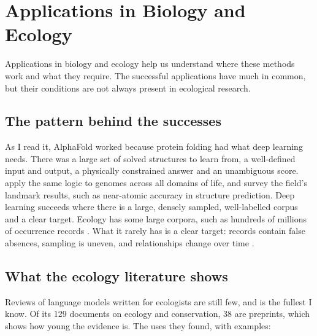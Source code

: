\chapter{Applications in Biology and Ecology}
\label{ch:applications}

Applications in biology and ecology help us understand where these methods
work and what they require. The successful applications have much in common,
but their conditions are not always present in ecological research.

\section{The pattern behind the successes}

As I read it, AlphaFold worked because protein folding had what deep learning
needs. There was a large set of solved structures to learn from, a well-defined
input and output, a physically constrained answer and an unambiguous score.
\textcite{brixi2026evo2} apply the same logic to genomes across all domains of
life, and \textcite{jiang2025aibioinformatics} survey the field's landmark
results, such as near-atomic accuracy in structure prediction. Deep learning
succeeds where there is a large, densely sampled, well-labelled corpus and a
clear target. Ecology has some large corpora, such as hundreds of millions of
occurrence records \parencite{hughes2021sampling}. What it rarely has is a clear
target: records contain false absences, sampling is uneven, and relationships
change over time \parencite{mishra2026notready}.

\section{What the ecology literature shows}

Reviews of language models written for ecologists are still few, and
\textcite{mammides2026llmecology} is the fullest I know. Of its 129 documents on
ecology and conservation, 38 are preprints, which shows how young the evidence
is. The uses they found, with examples:


